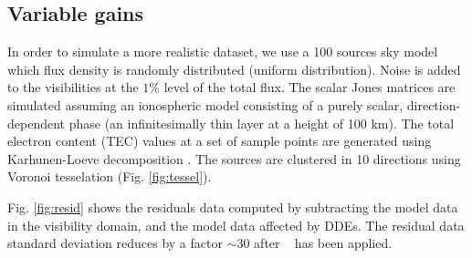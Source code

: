 \subsection{Variable gains}
\label{sec:VarSimul}

In order to simulate a more realistic dataset, we use a 100 sources
sky model which flux density is randomly distributed (uniform
distribution). Noise is added to the visibilities at the $1\%$ level
of the total flux. The scalar Jones matrices are simulated assuming an
ionospheric model consisting of a purely scalar, direction-dependent
phase (an infinitesimally thin layer at a height of 100 km). The total
electron content (TEC) values at a set of sample points are generated
using Karhunen-Loeve decomposition \citep[the spatial correlation is
  given by Kolmogorov turbulence, see][]{Tol09}. The sources are
clustered in 10 directions using Voronoi tesselation
(Fig. \ref{fig:tessel}).

Fig. \ref{fig:resid} shows the residuals data computed by subtracting
the model data in the visibility domain, and the model data affected
by DDEs. The residual data standard deviation reduces by a factor
$\sim30$ after \COH~ has been applied.




